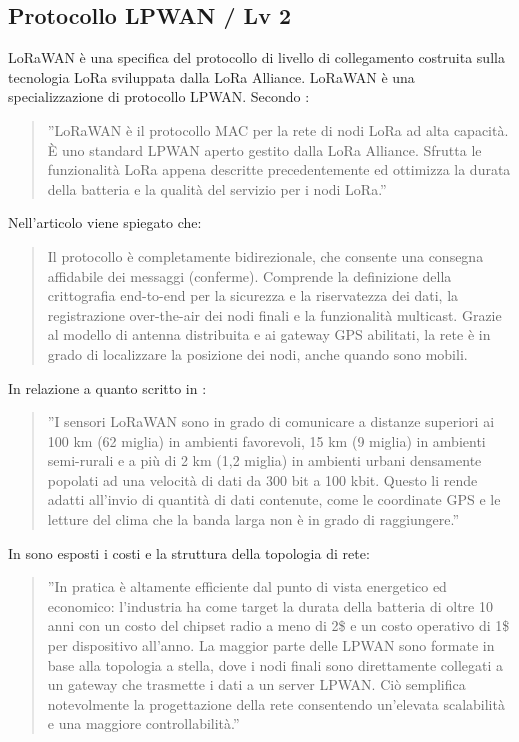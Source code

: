 \documentclass[a4paper]{report} %
\begin{document}
\subsection{Protocollo LPWAN / Lv 2}
LoRaWAN è una specifica del protocollo di livello di collegamento costruita sulla tecnologia LoRa sviluppata dalla LoRa Alliance.%
LoRaWAN è una specializzazione di protocollo LPWAN. Secondo \cite{art:rif.24}:
\begin{quote}
	''LoRaWAN è il protocollo MAC per la rete di nodi LoRa ad alta capacità. È uno standard LPWAN aperto gestito dalla LoRa Alliance. Sfrutta le funzionalità LoRa appena descritte precedentemente ed ottimizza la durata della batteria e la qualità del servizio per i nodi LoRa.''
\end{quote}
Nell'articolo \cite{art:rif.30} viene spiegato che:
\begin{quote}
	Il protocollo è completamente bidirezionale, che consente una consegna affidabile dei messaggi (conferme). Comprende la definizione della crittografia end-to-end per la sicurezza e la riservatezza dei dati, la registrazione over-the-air dei nodi finali e la funzionalità multicast. Grazie al modello di antenna distribuita e ai gateway GPS abilitati, la rete è in grado di localizzare la posizione dei nodi, anche quando sono mobili.
\end{quote}
In relazione a quanto scritto in \cite{art:rif.25}:
\begin{quote}
	''I sensori LoRaWAN sono in grado di comunicare a distanze superiori ai 100 km (62 miglia) in ambienti favorevoli, 15 km (9 miglia) in ambienti semi-rurali e a più di 2 km (1,2 miglia) in ambienti urbani densamente popolati ad una velocità di dati da 300 bit a 100 kbit. Questo li rende adatti all'invio di quantità di dati contenute, come le coordinate GPS e le letture del clima che la banda larga non è in grado di raggiungere.''%
\end{quote}
In \cite{art:rif.47} sono esposti i costi e la struttura della topologia di rete:
\begin{quote}
	''In pratica è altamente efficiente dal punto di vista energetico ed economico: l'industria ha come target la durata della batteria di oltre 10 anni con un costo del chipset radio a meno di 2\$ e un costo operativo di 1\$ per dispositivo all'anno. La maggior parte delle LPWAN sono formate in base alla topologia a stella, dove i nodi finali sono direttamente collegati a un gateway che trasmette i dati a un server LPWAN. Ciò semplifica notevolmente la progettazione della rete consentendo un'elevata scalabilità e una maggiore controllabilità.''
\end{quote}
\end{document}

